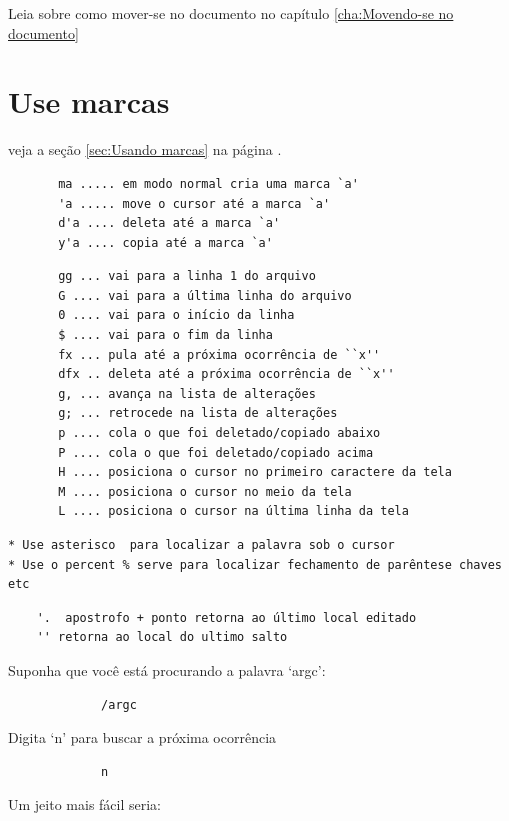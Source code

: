 \documentclass[10pt,a4paper,openany]{book}
\begin{document}
Leia sobre como mover-se no documento no capítulo \ref{cha:Movendo-se no documento}

\section{Use marcas}
veja a seção \ref{sec:Usando marcas} na página \pageref{sec:Usando marcas}.

\begin{verbatim}
	   ma ..... em modo normal cria uma marca `a'
	   'a ..... move o cursor até a marca `a'
	   d'a .... deleta até a marca `a'
	   y'a .... copia até a marca `a'
\end{verbatim}



\begin{verbatim}
	   gg ... vai para a linha 1 do arquivo
	   G .... vai para a última linha do arquivo
	   0 .... vai para o início da linha
	   $ .... vai para o fim da linha
	   fx ... pula até a próxima ocorrência de ``x''
	   dfx .. deleta até a próxima ocorrência de ``x''
	   g, ... avança na lista de alterações
	   g; ... retrocede na lista de alterações
	   p .... cola o que foi deletado/copiado abaixo
	   P .... cola o que foi deletado/copiado acima
	   H .... posiciona o cursor no primeiro caractere da tela
	   M .... posiciona o cursor no meio da tela
	   L .... posiciona o cursor na última linha da tela
\end{verbatim}

\begin{verbatim}
* Use asterisco  para localizar a palavra sob o cursor
* Use o percent % serve para localizar fechamento de parêntese chaves etc
\end{verbatim}

\begin{verbatim}
    '.  apostrofo + ponto retorna ao último local editado
    '' retorna ao local do ultimo salto
\end{verbatim}

Suponha que você está procurando a palavra `argc':

\begin{verbatim}
			 /argc
\end{verbatim}

Digita `n' para buscar a próxima ocorrência

\begin{verbatim}
			 n
\end{verbatim}

Um jeito mais fácil seria:
\end{document}
